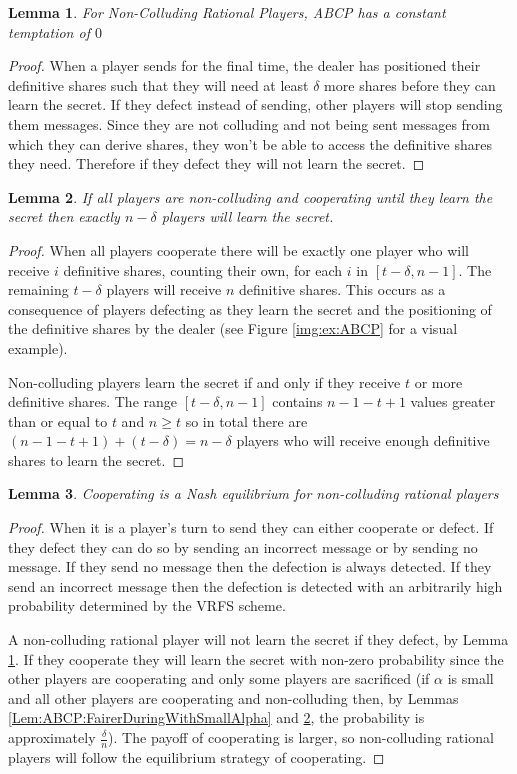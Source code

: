 \documentclass{dalcsthesis}
\newtheorem{lemma}{Lemma}
\begin{document}
\begin{lemma} For Non-Colluding Rational Players, ABCP has a constant temptation of $0$ \label{Lem:ABCP:SoloTemptNone} \end{lemma}
\begin{proof}
When a player sends for the final time, the dealer has positioned their definitive shares such that they will need at least $\delta$ more shares before they can learn the secret. If they defect instead of sending, other players will stop sending them messages. Since they are not colluding and not being sent messages from which they can derive shares, they won't be able to access the definitive shares they need. Therefore if they defect they will not learn the secret.
\end{proof}

\begin{lemma}If all players are non-colluding and cooperating until they learn the secret then exactly $n-\delta$ players will learn the secret. \label{Lem:ABCP:AllDeltaLose}\end{lemma}
\begin{proof}
When all players cooperate there will be exactly one player who will receive $i$ definitive shares, counting their own, for each $i$ in $[t-\delta, n-1]$. The remaining $t-\delta$ players will receive $n$ definitive shares. This occurs as a consequence of players defecting as they learn the secret and the positioning of the definitive shares by the dealer (see Figure \ref{img:ex:ABCP} for a visual example).

Non-colluding players learn the secret if and only if they receive $t$ or more definitive shares. The range $[t-\delta, n-1]$ contains $n-1-t+1$ values greater than or equal to $t$ and $n \geq t$ so in total there are $(n-1-t+1) + (t-\delta) = n-\delta$ players who will receive enough definitive shares to learn the secret.
\end{proof}

\begin{lemma} Cooperating is a Nash equilibrium for non-colluding rational players \end{lemma}
\begin{proof}
When it is a player's turn to send they can either cooperate or defect. If they defect they can do so by sending an incorrect message or by sending no message. If they send no message then the defection is always detected. If they send an incorrect message then the defection is detected with an arbitrarily high probability determined by the VRFS scheme.

A non-colluding rational player will not learn the secret if they defect, by Lemma \ref{Lem:ABCP:SoloTemptNone}. If they cooperate they will learn the secret with non-zero probability  since the other players are cooperating and only some players are sacrificed (if $\alpha$ is small and all other players are cooperating and non-colluding then, by Lemmas \ref{Lem:ABCP:FairerDuringWithSmallAlpha} and \ref{Lem:ABCP:AllDeltaLose}, the probability is approximately $\frac{\delta}{n}$). The payoff of cooperating is larger, so non-colluding rational players will follow the equilibrium strategy of cooperating.
\end{proof}
\end{document}
